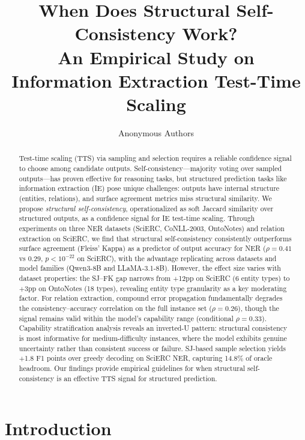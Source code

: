 \documentclass[11pt]{article}
\title{When Does Structural Self-Consistency Work?\\ An Empirical Study on Information Extraction Test-Time Scaling}
\author{
  Anonymous Authors
}
\date{}
\begin{document}
\maketitle

\begin{abstract}
Test-time scaling (TTS) via sampling and selection requires a reliable confidence signal to choose among candidate outputs.
Self-consistency---majority voting over sampled outputs---has proven effective for reasoning tasks, but structured prediction tasks like information extraction (IE) pose unique challenges: outputs have internal structure (entities, relations), and surface agreement metrics miss structural similarity.
We propose \emph{structural self-consistency}, operationalized as soft Jaccard similarity over structured outputs, as a confidence signal for IE test-time scaling.
Through experiments on three NER datasets (SciERC, CoNLL-2003, OntoNotes) and relation extraction on SciERC, we find that structural self-consistency consistently outperforms surface agreement (Fleiss' Kappa) as a predictor of output accuracy for NER ($\rho{=}0.41$ vs $0.29$, $p{<}10^{-22}$ on SciERC), with the advantage replicating across datasets and model families (Qwen3-8B and LLaMA-3.1-8B).
However, the effect size varies with dataset properties: the SJ--FK gap narrows from $+$12pp on SciERC (6 entity types) to $+$3pp on OntoNotes (18 types), revealing entity type granularity as a key moderating factor.
For relation extraction, compound error propagation fundamentally degrades the consistency--accuracy correlation on the full instance set ($\rho{=}0.26$), though the signal remains valid within the model's capability range (conditional $\rho{=}0.33$).
Capability stratification analysis reveals an inverted-U pattern: structural consistency is most informative for medium-difficulty instances, where the model exhibits genuine uncertainty rather than consistent success or failure.
SJ-based sample selection yields $+$1.8 F1 points over greedy decoding on SciERC NER, capturing 14.8\% of oracle headroom.
Our findings provide empirical guidelines for when structural self-consistency is an effective TTS signal for structured prediction.
\end{abstract}

\section{Introduction}
\end{document}
